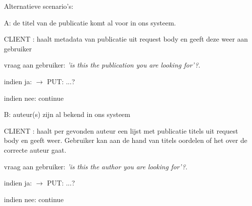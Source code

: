 \documentclass{article}
\begin{document}
\noindent Alternatieve scenario's: 

\begin{description}

\item A: de titel van de publicatie komt al voor in ons systeem. 
 	\begin{description}
 	\item CLIENT : haalt metadata van publicatie uit request body en geeft deze weer aan gebruiker
 		\begin{description}
		\item vraag aan gebruiker:  \emph{'is this the publication you are looking for'?}. 
		\item indien ja:  $\rightarrow$ PUT:  ...? 
		\item indien nee: continue
		\end{description}
  	\end{description}
\item B:  auteur(s) zijn al bekend in ons systeem
 	\begin{description}
 	\item CLIENT : haalt per gevonden auteur een lijst met publicatie titels uit request body en geeft weer. Gebruiker kan aan de hand van titels oordelen of het over de correcte auteur gaat. 
 		\begin{description}
		\item vraag aan gebruiker:  \emph{'is this the author you are looking for'?}. 
		\item indien ja:  $\rightarrow$ PUT:  ...? 
		\item indien nee: continue
		\end{description}
  	\end{description}
  
 \end{description}
\end{document}
